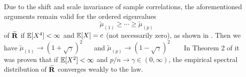 Due to the shift and scale invariance of sample correlations, the aforementioned arguments remain valid for the ordered eigenvalues 
\begin{equation*}
\widetilde{\mu}_{(1)}\ge \cdots \ge \widetilde{\mu}_{(p)}
\end{equation*}
of $\widetilde{{\mathbf R}}$ if $\mathbb{E}[X^4]<\infty$ and $\mathbb{E}[X]=c$ (not necessarily zero), as shown in \cite{jiang:2004}. Then we have $\widetilde{\mu}_{(1)} \to (1+\sqrt{\gamma})^2$~ \as ~ and $\widetilde{\mu}_{(p)} \to (1-\sqrt{\gamma})^2$ ~ \as~
In Theorem 2 of \cite{jiang:2004} it was proven that if $\mathbb{E}[X^2]< \infty$ and $p/n\to \gamma\in (0,\infty)$, the empirical spectral distribution of $\widetilde{{\mathbf R}}$ converges weakly to the \MP law.




